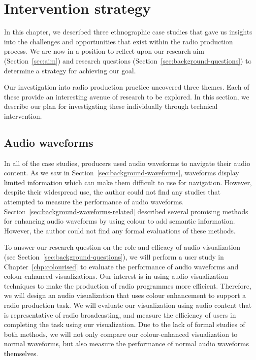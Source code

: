 \section{Intervention strategy}\label{sec:ethno-strategy}

In this chapter, we described three ethnographic case studies that gave us insights into the challenges and
opportunities that exist within the radio production process.  We are now in a position to reflect upon our research
aim (Section~\ref{sec:aim}) and research questions (Section~\ref{sec:background-questions}) to determine a strategy for
achieving our goal.

Our investigation into radio production practice uncovered three themes. Each of these provide an interesting avenue
of research to be explored. In this section, we describe our plan for investigating these individually through
technical intervention.

\subsection{Audio waveforms}

In all of the case studies, producers used audio waveforms to navigate their audio content.  As we saw in
Section~\ref{sec:background-waveforms}, waveforms display limited information which can make them difficult to use for
navigation.  However, despite their widespread use, the author could not find any studies that attempted to measure the
performance of audio waveforms.  Section~\ref{sec:background-waveforms-related} described several promising methods for
enhancing audio waveforms by using colour to add semantic information. However, the author could not find any formal
evaluations of these methods.

To answer our research question on the role and efficacy of audio visualization (see
Section~\ref{sec:background-questions}), we will perform a user study in Chapter~\ref{chp:colourised} to evaluate the
performance of audio waveforms and colour-enhanced visualizations. Our interest is in using audio visualization
techniques to make the production of radio programmes more efficient.  Therefore, we will design an audio visualization
that uses colour enhancement to support a radio production task.  We will evaluate our visualization using audio
content that is representative of radio broadcasting, and measure the efficiency of users in completing the task using
our visualization. Due to the lack of formal studies of both methods, we will not only compare our colour-enhanced
visualization to normal waveforms, but also measure the performance of normal audio waveforms themselves.

